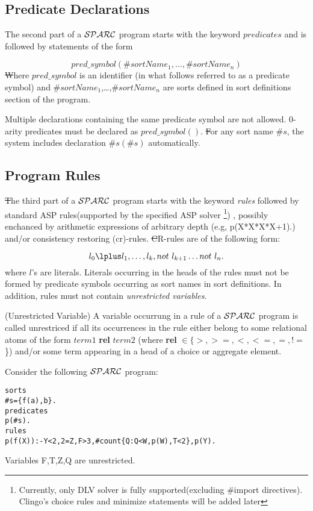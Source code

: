 \documentclass[12pt, letterpaper]{article}
\begin{document}
\subsection{Predicate Declarations}

\noindent  The second part of a  ${\cal SPARC}$ program starts with the keyword
$predicates$ and is followed by statements of the form

\begin{equation*}
pred\_symbol(\#sortName_1,\dots,\#sortName_n)
\end{equation*}
\st

Where $pred\_symbol$ is an identifier (in what follows referred to as a predicate symbol) and  $\#sortName_1$,\dots,$\#sortName_n$ are sorts defined in sort definitions section of the program.



Multiple declarations containing the same predicate symbol are not allowed.
0-arity predicates must be declared as $pred\_symbol()$.
\st For any sort name $\#s$, the system includes declaration  $\#s(\#s)$ automatically. 

\subsection{Program Rules}
\st The third part of a ${\cal SPARC}$ program starts with the keyword \textit{rules} followed by standard ASP rules(supported by the specified ASP solver
\footnote{Currently, only DLV solver is fully supported(excluding \#import directives). Clingo's choice rules and minimize statements will be added later}) 
, possibly enchanced by arithmetic expressions of arbitrary depth (e.g, p(X*X*X*X+1).) and/or consistency restoring (cr)-rules.
\st
CR-rules are of the following form:

\begin{equation}
   [label:] l_0 \lplus l_1,  \ldots, l_k, not~l_{k+1} \ldots not~l_{n}.
 \end{equation}
where $l$'s are literals.
Literals occurring in the heads of the rules must not be formed by predicate symbols
occurring as sort names in sort definitions. In addition, rules must not contain \textit{unrestricted variables}.

\begin{definition}(Unrestricted Variable)
 A variable occurrung in a rule of a ${\cal SPARC}$ program is called unrestriced if all its occurrences in the rule either belong to some relational atoms of the form 
$term1$ \textbf{rel} $term2$ (where \textbf{rel} $\in  \{>,>=,<,<=,=,!=$\})  and/or  some term appearing in a head of a choice or aggregate element. 
\end{definition}
\begin{example}
\em{
 Consider the following ${\cal SPARC}$ program:
\begin{verbatim}
sorts
#s={f(a),b}.
predicates
p(#s).
rules
p(f(X)):-Y<2,2=Z,F>3,#count{Q:Q<W,p(W),T<2},p(Y).
\end{verbatim}
Variables F,T,Z,Q are unrestricted.
}  
\end{example}
\end{document}
